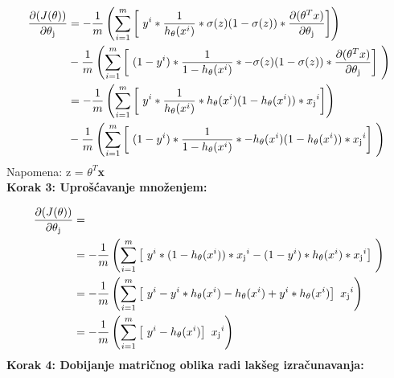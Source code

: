 \documentclass[a4paper,12pt]{report}
\begin{document}
\begin{equation}
\begin{split}
	\frac{\partial (J(\theta))}{\partial \theta\textsubscript{j}} & = - \frac{1}{m} \left( \sum_{i=1}^{m} \left[\ y^i * \frac{1}{h\textsubscript {$\theta$} (x^i)} * \sigma(z)(1-\sigma(z))  * \frac{\partial (\theta^T x)}{\partial \theta\textsubscript{j}} \right] \right) \\ 
 		& - \frac{1}{m} \left( \sum_{i=1}^{m} \left[\ (1 - y^i) * \frac{1}{1 - h\textsubscript {$\theta$} (x^i)} * -\sigma(z)(1-\sigma(z))  * \frac{\partial (\theta^T x)}{\partial \theta\textsubscript{j}}\right]\ \right) \\
 		& = - \frac{1}{m} \left( \sum_{i=1}^{m} \left[\ y^i * \frac{1}{h\textsubscript {$\theta$} (x^i)} * {h\textsubscript {$\theta$} (x^i)}(1-{h\textsubscript {$\theta$} (x^i)})  * x\textsubscript{j}^i \right] \right) \\ 
 		& - \frac{1}{m} \left( \sum_{i=1}^{m} \left[\ (1 - y^i) * \frac{1}{1 - h\textsubscript {$\theta$} (x^i)} * -{h\textsubscript {$\theta$} (x^i)}(1-{h\textsubscript {$\theta$} (x^i)})  * x\textsubscript{j}^i\right]\ \right) \\
\end{split}
\end{equation}
Napomena: z = \textbf{$\theta^T$x} \\

\textbf{Korak 3: Uprošćavanje množenjem:} 

\begin{equation}
\begin{split}
	\frac{\partial (J(\theta))}{\partial \theta\textsubscript{j}} & = \\
	 & = - \frac{1}{m} \left( \sum_{i=1}^{m} \left[\ y^i * (1-{h\textsubscript {$\theta$} (x^i)})  * x\textsubscript{j}^i  - (1 - y^i)  * {h\textsubscript {$\theta$} (x^i)}  * x\textsubscript{j}^i\right]\ \right) \\
	  & = - \frac{1}{m} \left( \sum_{i=1}^{m} \left[\ y^i  - y^i * {h\textsubscript {$\theta$} (x^i)} - {h\textsubscript {$\theta$} (x^i)} + y^i  * {h\textsubscript {$\theta$} (x^i)} \right]\ x\textsubscript{j}^i  \right)  \\
	   & = - \frac{1}{m} \left( \sum_{i=1}^{m} \left[\ y^i  - {h\textsubscript {$\theta$} (x^i)} \right]\ x\textsubscript{j}^i  \right)  \\
\end{split}
\end{equation}
\textbf{Korak 4: Dobijanje matričnog oblika radi lakšeg izračunavanja:}
\end{document}
